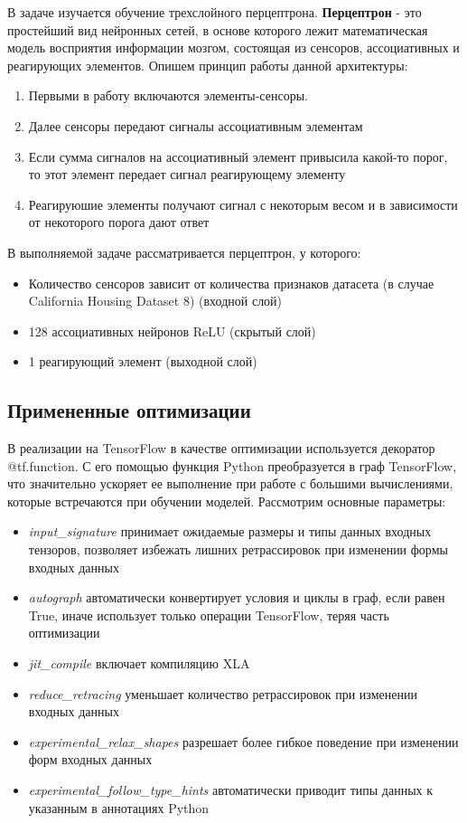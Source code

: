 \documentclass[a4paper,12pt,titlepage,final]{article}
\begin{document}
В задаче изучается обучение трехслойного перцептрона. \textbf{Перцептрон} - это простейший вид нейронных сетей, в основе которого лежит математическая модель восприятия информации мозгом, состоящая из сенсоров, ассоциативных и реагирующих элементов. Опишем принцип работы данной архитектуры:
\begin{enumerate}
    \item Первыми в работу включаются элементы-сенсоры.
    \item Далее сенсоры передают сигналы ассоциативным элементам
    \item Если сумма сигналов на ассоциативный элемент привысила какой-то порог, то этот элемент передает сигнал реагирующему элементу
    \item Реагируюшие элементы получают сигнал с некоторым весом и в зависимости от некоторого порога дают ответ
\end{enumerate}

В выполняемой задаче рассматривается перцептрон, у которого:
\begin{itemize}
    \item Количество сенсоров зависит от количества признаков датасета (в случае California Housing Dataset 8) (входной слой)
    \item 128 ассоциативных нейронов ReLU (скрытый слой)
    \item 1 реагирующий элемент (выходной слой)
\end{itemize}

\begin{center}
    \item \subsection{Примененные оптимизации}
\end{center}

В реализации на TensorFlow в качестве оптимизации используется декоратор @tf.function. С его помощью функция Python преобразуется в граф TensorFlow, что значительно ускоряет ее выполнение при работе с большими вычислениями, которые встречаются при обучении моделей. Рассмотрим основные параметры:
\begin{itemize}
    \item \textit{input\_signature} принимает ожидаемые размеры и типы данных входных тензоров, позволяет избежать лишних ретрассировок при изменении формы входных данных
    \item \textit{autograph} автоматически конвертирует условия и циклы в граф, если равен True, иначе использует только операции TensorFlow, теряя часть оптимизации
    \item \textit{jit\_compile} включает компиляцию XLA
    \item \textit{reduce\_retracing} уменьшает количество ретрассировок при изменении входных данных
    \item \textit{experimental\_relax\_shapes} разрешает более гибкое поведение при изменении форм входных данных
    \item \textit{experimental\_follow\_type\_hints} автоматически приводит типы данных к указанным в аннотациях Python
\end{itemize}
\end{document}
